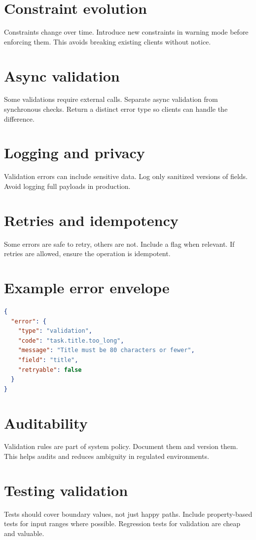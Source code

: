 \section{Constraint evolution}
Constraints change over time.
Introduce new constraints in warning mode before enforcing them.
This avoids breaking existing clients without notice.

\section{Async validation}
Some validations require external calls.
Separate async validation from synchronous checks.
Return a distinct error type so clients can handle the difference.

\section{Logging and privacy}
Validation errors can include sensitive data.
Log only sanitized versions of fields.
Avoid logging full payloads in production.

\section{Retries and idempotency}
Some errors are safe to retry, others are not.
Include a  flag when relevant.
If retries are allowed, ensure the operation is idempotent.

\section{Example error envelope}
\begin{lstlisting}[language=JSON]
{
  "error": {
    "type": "validation",
    "code": "task.title.too_long",
    "message": "Title must be 80 characters or fewer",
    "field": "title",
    "retryable": false
  }
}
\end{lstlisting}

\section{Auditability}
Validation rules are part of system policy.
Document them and version them.
This helps audits and reduces ambiguity in regulated environments.

\section{Testing validation}
Tests should cover boundary values, not just happy paths.
Include property-based tests for input ranges where possible.
Regression tests for validation are cheap and valuable.

